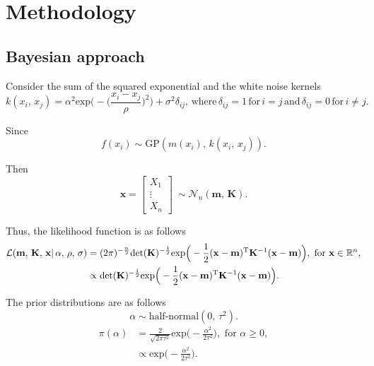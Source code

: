 \section{Methodology}
   \subsection{Bayesian approach}

      Consider the sum of the squared exponential and the white noise kernels
      \[k(x_{i}, \, x_{j}) = \alpha^{2} \text{exp} \bigg(- \Big(\frac{x_i - x_j}{\rho} \Big)^2 \bigg) + 
      \sigma^2\delta_{ij}, \, \text{where} \, \delta_{ij} = 1 \, \text{for} \, i = j \, \text{and} \, \delta_{ij} = 0 \, \text{for} \, i \neq j.\]

      Since
      \[f(x_{i}) \sim \text{GP}(m(x_{i}) ,\, k(x_{i},\, x_{j})).\]

      Then
      \[\mathbf{x} =
      \begin{bmatrix}
         X_{1} \\
         \vdots \\
         X_{n}
      \end{bmatrix}
      \:
      \sim \mathcal{N}_{n}(\mathbf{m}, \, \mathbf{K}).\]

      Thus, the likelihood function is as follows
      \begin{align*}
         \mathcal{L}(\mathbf{m} ,\, \mathbf{K} ,\, \mathbf{x}| \, \alpha ,\, \rho ,\, \sigma)
         & = (2\pi)^{-\frac{n}{2}}\text{det} (\mathbf{K})^{-\frac{1}{2}} 
         \text{exp} \Big(-\frac{1}{2} (\mathbf{x} - \mathbf{m})^{\text{\text{T}}} \mathbf{K}^{-1} (\mathbf{x} - \mathbf{m}) \Big),
         \text{ for } \mathbf{x} \in \mathbb{R}^{n},\\
         & \propto \text{det}(\mathbf{K})^{-\frac{1}{2}} 
         \text{exp} \Big(-\frac{1}{2} (\mathbf{x} - \mathbf{m})^{\text{\text{T}}} \mathbf{K}^{-1} (\mathbf{x} - \mathbf{m}) \Big).
      \end{align*}

      The prior distributions are as follows
      \[\alpha \sim \text{half-normal} (0, \, \tau^2).\]
      \begin{align*}
         \pi(\alpha) 
         & = \frac{2}{\sqrt{2\pi\tau^2}} \text{exp} \Big(-\frac{\alpha^2}{2\tau^2} \Big), \text{ for } \alpha \geq 0,\\
         & \propto \text{exp} \Big(-\frac{\alpha^2}{2\tau^2} \Big).
      \end{align*}

